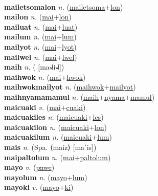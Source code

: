  \label{mailetsomales} \\
\textbf{mailetsomalon} \textit{n.} (\hyperref[mailetsoma]{mailetsoma}+\hyperref[lon]{lon})
 \label{mailetsomalon} \\
\textbf{mailon} \textit{n.} (\hyperref[mai]{mai}+\hyperref[lon]{lon})
 \label{mailon} \\
\textbf{mailuat} \textit{n.} (\hyperref[mai]{mai}+\hyperref[luat]{luat})
 \label{mailuat} \\
\textbf{mailum} \textit{n.} (\hyperref[mai]{mai}+\hyperref[lum]{lum})
 \label{mailum} \\
\textbf{mailyot} \textit{n.} (\hyperref[mai]{mai}+\hyperref[lyot]{lyot})
 \label{mailyot} \\
\textbf{mailwel} \textit{n.} (\hyperref[mai]{mai}+\hyperref[lwel]{lwel})
 \label{mailwel} \\
\textbf{maih} \textit{n.} ( [ma˧˩˧i˧˩˧])
 \label{maih} \\
\textbf{maihwok} \textit{n.} (\hyperref[mai]{mai}+\hyperref[hwok]{hwok})
 \label{maihwok} \\
\textbf{maihwokmailyot} \textit{n.} (\hyperref[maihwok]{maihwok}+\hyperref[mailyot]{mailyot})
 \label{maihwokmailyot} \\
\textbf{maihnyamamamul} \textit{n.} (\hyperref[maih]{maih}+\hyperref[nyama]{nyama}+\hyperref[mamul]{mamul})
 \label{maihnyamamamul} \\
\textbf{maicuaki} \textit{v.} (\hyperref[mai]{mai}+\hyperref[cuaki]{cuaki})
 \label{maicuaki} \\
\textbf{maicuakiles} \textit{n.} (\hyperref[maicuaki]{maicuaki}+\hyperref[les]{les})
 \label{maicuakiles} \\
\textbf{maicuakilon} \textit{n.} (\hyperref[maicuaki]{maicuaki}+\hyperref[lon]{lon})
 \label{maicuakilon} \\
\textbf{maicuakilum} \textit{n.} (\hyperref[maicuaki]{maicuaki}+\hyperref[lum]{lum})
 \label{maicuakilum} \\
\textbf{mais} \textit{n.} (Spa. ⟨maíz⟩ [maˈis])
 \label{mais} \\
\textbf{maipaltolum} \textit{n.} (\hyperref[mai]{mai}+\hyperref[paltolum]{paltolum})
 \label{maipaltolum} \\
\textbf{mayo} \textit{v.} (\hyperref[pawe]{\sout{pawe}})
 \label{mayo} \\
\textbf{mayolum} \textit{n.} (\hyperref[mayo]{mayo}+\hyperref[lum]{lum})
 \label{mayolum} \\
\textbf{mayoki} \textit{v.} (\hyperref[mayo]{mayo}+\hyperref[ki]{ki})
